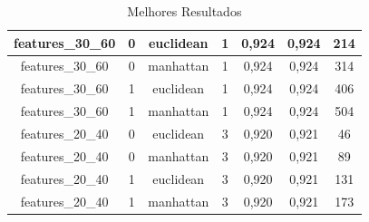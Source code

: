 \documentclass[12pt]{article}
\begin{document}
\begin{table}[!htb]
\begin{tabular}{|c|c|c|c|c|c|c|}
  features\_30\_60    & 0                   & euclidean         & 1          & 0,924             & 0,924            & 214                     \\ \hline
  features\_30\_60    & 0                   & manhattan         & 1          & 0,924             & 0,924            & 314                     \\ \hline
  features\_30\_60    & 1                   & euclidean         & 1          & 0,924             & 0,924            & 406                     \\ \hline
  features\_30\_60    & 1                   & manhattan         & 1          & 0,924             & 0,924            & 504                     \\ \hline
  features\_20\_40    & 0                   & euclidean         & 3          & 0,920             & 0,921            & 46                      \\ \hline
  features\_20\_40    & 0                   & manhattan         & 3          & 0,920             & 0,921            & 89                      \\ \hline
  features\_20\_40    & 1                   & euclidean         & 3          & 0,920             & 0,921            & 131                     \\ \hline
  features\_20\_40    & 1                   & manhattan         & 3          & 0,920             & 0,921            & 173                     \\ \hline
  \end{tabular}
  \caption{Melhores Resultados}
  \label{tab:resultados_melhores}
\end{table}
\end{document}
